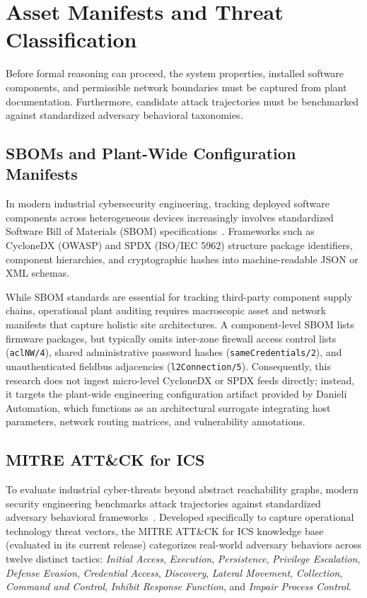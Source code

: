 \documentclass[target=mst,aauheader=aics,style=]{thud}
\begin{document}
\section{Asset Manifests and Threat Classification}
\label{sec:manifests_threat_class}

Before formal reasoning can proceed, the system properties, installed software components, and permissible network boundaries must be captured from plant documentation. Furthermore, candidate attack trajectories must be benchmarked against standardized adversary behavioral taxonomies.

\subsection{SBOMs and Plant-Wide Configuration Manifests}
\label{sec:sboms_vs_manifests}
In modern industrial cybersecurity engineering, tracking deployed software components across heterogeneous devices increasingly involves standardized Software Bill of Materials (SBOM) specifications~\cite{cyclonedx, spdx}. Frameworks such as CycloneDX (OWASP) and SPDX (ISO/IEC 5962) structure package identifiers, component hierarchies, and cryptographic hashes into machine-readable JSON or XML schemas.

While SBOM standards are essential for tracking third-party component supply chains, operational plant auditing requires macroscopic asset and network manifests that capture holistic site architectures. A component-level SBOM lists firmware packages, but typically omits inter-zone firewall access control lists (\texttt{aclNW/4}), shared administrative password hashes (\texttt{sameCredentials/2}), and unauthenticated fieldbus adjacencies (\texttt{l2Connection/5}). Consequently, this research does not ingest micro-level CycloneDX or SPDX feeds directly; instead, it targets the plant-wide engineering configuration artifact provided by Danieli Automation, which functions as an architectural surrogate integrating host parameters, network routing matrices, and vulnerability annotations.

\subsection{MITRE ATT\&CK for ICS}
\label{subsec:mitre_ics}

To evaluate industrial cyber-threats beyond abstract reachability graphs, modern security engineering benchmarks attack trajectories against standardized adversary behavioral frameworks~\cite{mitre2024ics}. Developed specifically to capture operational technology threat vectors, the MITRE ATT\&CK for ICS knowledge base (evaluated in its current release) categorizes real-world adversary behaviors across twelve distinct tactics: \textit{Initial Access}, \textit{Execution}, \textit{Persistence}, \textit{Privilege Escalation}, \textit{Defense Evasion}, \textit{Credential Access}, \textit{Discovery}, \textit{Lateral Movement}, \textit{Collection}, \textit{Command and Control}, \textit{Inhibit Response Function}, and \textit{Impair Process Control}.
\end{document}
